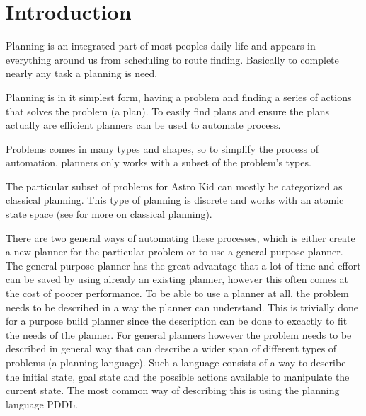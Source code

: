 \chapter{Introduction}	
	Planning is an integrated part of most peoples daily life and appears in everything around us from scheduling to route finding. Basically to complete nearly any task a planning is need.
	


	Planning is in it simplest form, having a problem and finding a series of actions that solves the problem (a plan). To easily find plans and ensure the plans actually are efficient planners can be used to automate process.  
	
	Problems comes in many types and shapes, so to simplify the process of automation, planners only works with a subset of the problem's types. 

	The particular subset of problems for Astro Kid can mostly be categorized as classical planning. This type of planning is discrete and works with an atomic state space (see \cite{russell2014a} for more on classical planning).
	
	

	There are two general ways of automating these processes, which is either create a new planner for the particular problem or to use a general purpose planner. 
	The general purpose planner has the great advantage that a lot of time and effort can be saved by using already an existing planner, however this often comes at the cost of poorer performance.
	To be able to use a planner at all, the problem needs to be described in a way the planner can understand. This is trivially done for a purpose build planner since the description can be done to excactly to fit the needs of the planner. For general planners however the problem needs to be described in general way that can describe a wider span of different types of problems (a planning language). 	Such a language consists of a way to describe the initial state, goal state and the possible actions available to manipulate the current state. The most common way of describing this is using the planning language PDDL. 
	

